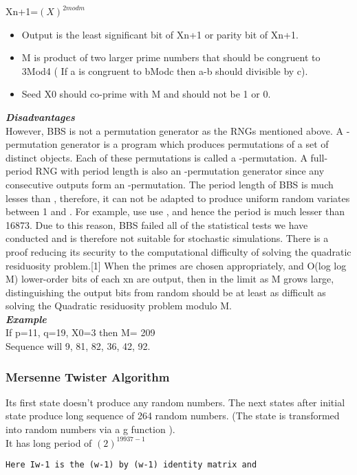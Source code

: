 \documentclass[12pt]{article}
\begin{document}
{Xn+1=$(X)^{2modm}$
\begin{itemize}
\item Output is the least significant bit of Xn+1 or parity bit of Xn+1.
\item M is product of two larger prime numbers that should be congruent to 3Mod4 ( If a is congruent to bModc then  a-b should divisible by c).
\item Seed X0 should co-prime with M and should not be 1 or 0.
\end{itemize}
\textbf{\textit {Disadvantages}}\\
However, BBS is not a permutation generator as the RNGs mentioned above. A -permutation generator is a program which produces permutations of a set of  distinct objects. Each of these permutations is called a -permutation. A full-period RNG with period length  is also an -permutation generator since any  consecutive outputs form an -permutation. The period length of BBS is much lesses than , therefore, it can not be adapted to produce uniform random variates between 1 and . For example, use use , and hence the period is much lesser than 16873. Due to this reason, BBS failed all of the statistical tests we have conducted and is therefore not suitable for stochastic simulations.
There is a proof reducing its security to the computational difficulty of solving the quadratic residuosity problem.[1] When the primes are chosen appropriately, and O(log log M) lower-order bits of each xn are output, then in the limit as M grows large, distinguishing the output bits from random should be at least as difficult as solving the Quadratic residuosity problem modulo M.\\
\textbf{\textit {Example}}\\
If p=11, q=19, X0=3 then M= 209\\
Sequence will 9, 81, 82, 36, 42, 92.\\

\subsubsection{Mersenne Twister Algorithm}
Its first state doesn’t produce any random numbers. The next states after initial state produce long sequence of 264 random numbers. (The state is transformed into random numbers via a g function ).\\
 It has long period of $(2)^{19937-1}$\\
\begin{verbatim}
Here Iw-1 is the (w-1) by (w-1) identity matrix and  


\end{verbatim}}
\end{document}
